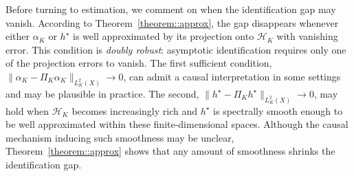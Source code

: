 \documentclass[11pt]{article}
\theoremstyle{plain}
\theoremstyle{definition}
\theoremstyle{remark}
\theoremstyle{definition}
\begin{document}
Before turning to estimation, we comment on when the identification gap may
vanish. According to Theorem~\ref{theorem::approx}, the gap disappears whenever
either \(\alpha_K\) or \(h^\star\) is well approximated by its projection onto
\(\mathcal{H}_K\) with vanishing error. This condition is \emph{doubly robust}:
asymptotic identification requires only one of the projection errors to vanish.
The first sufficient condition,
\(\|\alpha_K - \Pi_K \alpha_K\|_{L^2_K(X)} \to 0\), can admit a causal
interpretation in some settings and may be plausible in practice. The second, \(\|h^\star - \Pi_K h^\star\|_{L^2_K(X)} \to 0\), may hold when
\(\mathcal{H}_K\) becomes increasingly rich and \(h^\star\) is spectrally smooth
enough to be well approximated within these finite-dimensional spaces. Although the causal mechanism inducing such smoothness may be
unclear, Theorem~\ref{theorem::approx} shows that any amount of smoothness
shrinks the identification gap.





 
 
\end{document}
